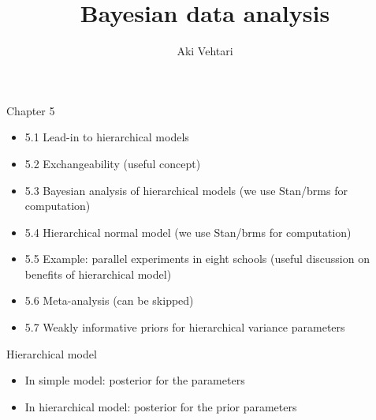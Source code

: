 \documentclass[finnish,english,t]{beamer}
\title[]{Bayesian data analysis}
\subtitle{}
\author{Aki Vehtari}
\institute[Aalto]{}
\begin{document}
\begin{frame}{Chapter 5}

  \begin{itemize}
\item 5.1 Lead-in to hierarchical models
\item 5.2 Exchangeability (useful concept)
\item {\color{gray}5.3 Bayesian analysis of hierarchical models (we use Stan/brms for computation)}
\item {\color{gray}5.4 Hierarchical normal model (we use Stan/brms for computation)}
\item 5.5 Example: parallel experiments in eight schools (useful discussion on benefits of hierarchical model)
\item {\color{gray}5.6 Meta-analysis (can be skipped)}
\item 5.7 Weakly informative priors for hierarchical variance parameters
\end{itemize}
\end{frame}

\begin{frame}{Hierarchical model}

  \begin{itemize}
  \item In simple model: posterior for the parameters
  \item In hierarchical model: posterior for the prior parameters
  \end{itemize}

\end{frame}
\end{document}

